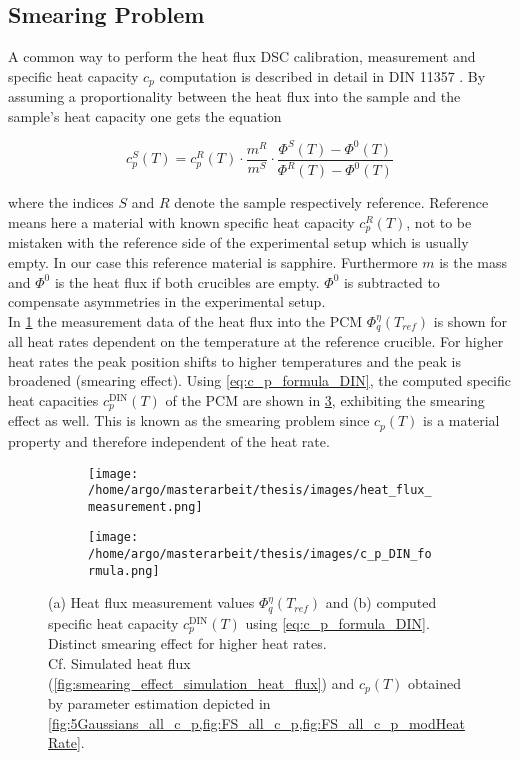 \documentclass{scrartcl}[12pt, halfparskip]
\numberwithin{equation}{section}
\numberwithin{figure}{section}
\numberwithin{table}{section}
\begin{document}
\subsection{Smearing Problem}
\label{sec:smearing_problem}
A common way to perform the heat flux DSC calibration, measurement and specific heat capacity $c_p$ computation is described in detail in DIN 11357 \cite{DIN_11357}. By assuming a proportionality between the heat flux into the sample and the sample's heat capacity one gets the equation

\begin{equation}
	c_p^S(T) = c_p^{R}(T) \cdot \frac{m^R}{m^S} \cdot \frac{\varPhi^S(T) - \varPhi^0(T)}{\varPhi^R(T) - \varPhi^0(T)}
	\label{eq:c_p_formula_DIN}
\end{equation}

where the indices $S$ and $R$ denote the sample respectively reference. Reference means here a material with known specific heat capacity $c_p^R(T)$, not to be mistaken with the reference side of the experimental setup which is usually empty. In our case this reference material is sapphire. Furthermore $m$ is the mass and $\varPhi^0$ is the heat flux if both crucibles are empty. $\varPhi^0$ is subtracted to compensate asymmetries in the experimental setup. \\
In \cref{fig:heat_flux_measurements} the measurement data of the heat flux into the PCM $\varPhi_q^{\eta}(T_{ref})$ is shown for all heat rates dependent on the temperature at the reference crucible. For higher heat rates the peak position shifts to higher temperatures and the peak is broadened (smearing effect). Using \cref{eq:c_p_formula_DIN}, the computed specific heat capacities $c_p^{\text{DIN}}(T)$ of the PCM are shown in \cref{fig:c_p_DIN_formula}, exhibiting the smearing effect as well. This is known as the smearing problem since $c_p(T)$ is a material property and therefore independent of the heat rate. \\

\enlargethispage{5\baselineskip}


\begin{figure}[H]
	\centering
	\begin{subfigure}{0.65\textwidth}
		\texttt{[image: /home/argo/masterarbeit/thesis/images/heat\_flux\_measurement.png]}
		\caption{}
		\label{fig:heat_flux_measurements}
	\end{subfigure}
	\begin{subfigure}{0.65\textwidth}
		\texttt{[image: /home/argo/masterarbeit/thesis/images/c\_p\_DIN\_formula.png]}
		\caption{}
		\label{fig:c_p_DIN_formula}
	\end{subfigure}
	\caption{(a) Heat flux measurement values $\varPhi_q^{\eta}(T_{ref})$ and (b) computed specific heat capacity $c_p^{\text{DIN}}(T)$ using \cref{eq:c_p_formula_DIN}. Distinct smearing effect for higher heat rates. \\
	Cf. Simulated heat flux (\cref{fig:smearing_effect_simulation_heat_flux}) and $c_p(T)$ obtained by parameter estimation depicted in \cref{fig:5Gaussians_all_c_p,fig:FS_all_c_p,fig:FS_all_c_p_modHeatRate}.}
\end{figure}
\end{document}
